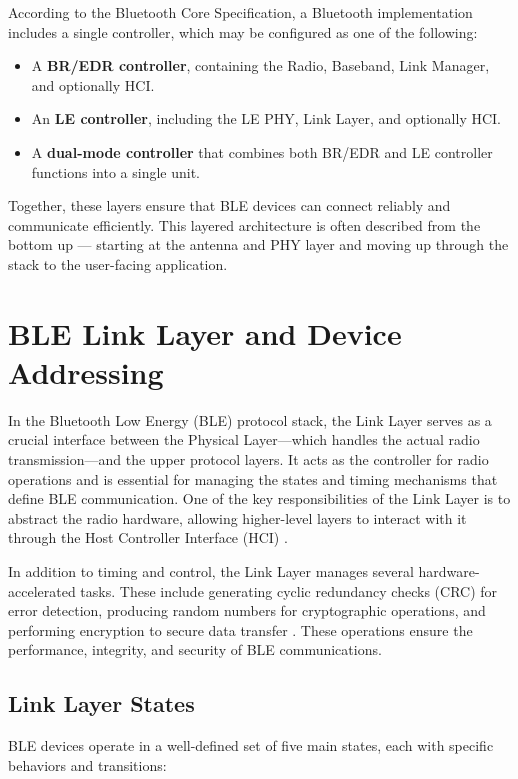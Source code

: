 According to the Bluetooth Core Specification, a Bluetooth implementation includes a single controller, which may be configured as one of the following:

\begin{itemize}
    \item A \textbf{BR/EDR controller}, containing the Radio, Baseband, Link Manager, and optionally HCI.
    \item An \textbf{LE controller}, including the LE PHY, Link Layer, and optionally HCI.
    \item A \textbf{dual-mode controller} that combines both BR/EDR and LE controller functions into a single unit.
\end{itemize}

Together, these layers ensure that BLE devices can connect reliably and communicate efficiently. This layered architecture is often described from the bottom up — starting at the antenna and PHY layer and moving up through the stack to the user-facing application.

\section{BLE Link Layer and Device Addressing}

In the Bluetooth Low Energy (BLE) protocol stack, the Link Layer serves as a crucial interface between the Physical Layer—which handles the actual radio transmission—and the upper protocol layers. It acts as the controller for radio operations and is essential for managing the states and timing mechanisms that define BLE communication. One of the key responsibilities of the Link Layer is to abstract the radio hardware, allowing higher-level layers to interact with it through the Host Controller Interface (HCI) \cite{introtoble}. 

In addition to timing and control, the Link Layer manages several hardware-accelerated tasks. These include generating cyclic redundancy checks (CRC) for error detection, producing random numbers for cryptographic operations, and performing encryption to secure data transfer \cite{introtoble}. These operations ensure the performance, integrity, and security of BLE communications.

\subsection{Link Layer States}

BLE devices operate in a well-defined set of five main states, each with specific behaviors and transitions:

